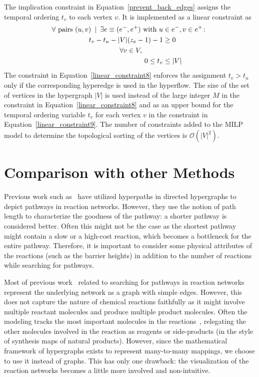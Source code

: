 The implication constraint in Equation~\eqref{prevent_back_edges} assigns the temporal ordering $t_v$ to each vertex $v$.
It is implemented as a linear constraint as
\begin{align}
    \forall \text{ pairs } (u, v)\,\,\,|\,\,\, \exists e\equiv (e^-, e^+) \text{ with } u &\in e^-, v \in e^+\colon \nonumber \\
    t_v - t_u - |V| (z_e - 1) - 1 &\geq 0 \label{linear_constraint8} \\
    \forall v\in V,\text{\hspace{1cm}}& \nonumber \\
    0 \leq t_v &\leq |V| \label{linear_constraint9}    
\end{align}
The constraint in Equation~\eqref{linear_constraint8} enforces the assignment $t_{v} > t_{u}$ only if the corresponding hyperedge is used in the hyperflow.
The size of the set of vertices in the hypergraph $|V|$ is used instead of the large integer $M$ in the constraint in Equation~\eqref{linear_constraint8} and as an upper bound for the temporal ordering variable $t_v$ for each vertex $v$ in the constraint in Equation~\eqref{linear_constraint9}.
The number of constraints added to the MILP model to determine the topological sorting of the vertices is $\mathcal{O}\left(|V|^2\right)$.

\section{Comparison with other Methods}
\label{discussions}

Previous work such as~\cite{shortest_path_hypergraph1,shortest_path_hypergraph2} have utilized hyperpaths in directed hypergraphs to depict pathways in reaction networks. However, they use the notion of path length to characterize the goodness of the pathway: a shorter pathway is considered better. Often this might not be the case as the shortest pathway might contain a slow or a high-cost reaction, which becomes a bottleneck for the entire pathway. Therefore, it is important to consider some physical attributes of the reactions (such as the barrier heights) in addition to the number of reactions while searching for pathways.

Most of previous work~\cite{graph_network1,graph_network2,graph_network3,heuristic_expert,reported_network} related to searching for pathways in reaction networks represent the underlying network as a graph with simple edges. However, this does not capture the nature of chemical reactions faithfully as it might involve multiple reactant molecules and produce multiple product molecules. Often the modeling tracks the most important molecules in the reactions~\cite{yaks,yarp}, relegating the other molecules involved in the reaction as reagents or side-products (in the style of synthesis maps of natural products). However, since the mathematical framework of hypergraphs exists to represent many-to-many mappings, we choose to use it instead of graphs. This has only one drawback: the visualization of the reaction networks becomes a little more involved and non-intuitive.

